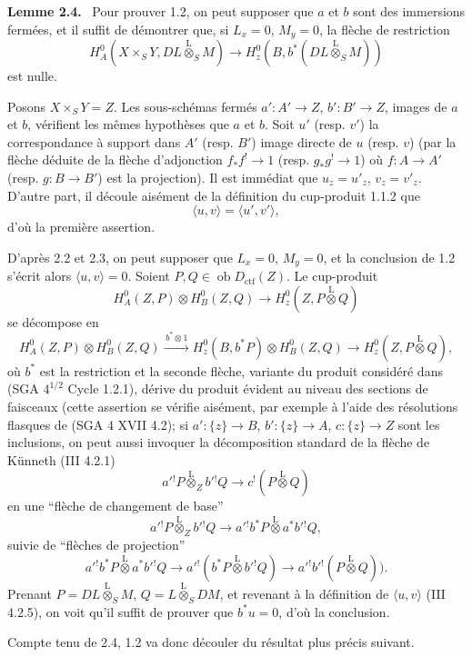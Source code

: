 \documentclass[11pt]{article}
\newenvironment{statement}[1]{\par\medskip\noindent\textbf{#1.}\ }{\par\medskip}
\providecommand{\lten}{\overset{\mathrm L}{\otimes}}
\providecommand{\Ob}{\operatorname{ob}}
\providecommand{\lten}{\overset{\mathrm L}{\otimes}}
\providecommand{\lten}{\overset{\mathrm L}{\otimes}}
\providecommand{\Ob}{\operatorname{ob}}
\providecommand{\lten}{\overset{\mathrm L}{\otimes}}
\providecommand{\lten}{\overset{\mathrm L}{\otimes}}
\providecommand{\Ob}{\operatorname{Ob}}
\providecommand{\lten}{\overset{\mathrm L}{\otimes}}
\providecommand{\Ob}{\operatorname{ob}}
\providecommand{\Ob}{\operatorname{Ob}}
\providecommand{\lten}{\overset{\mathrm L}{\otimes}}
\begin{document}
\begin{statement}{Lemme 2.4}
Pour prouver 1.2, on peut supposer que $a$ et $b$ sont des immersions fermées, et il suffit de démontrer que, si $L_x=0$, $M_y=0$, la flèche de restriction
\begin{equation}
H_A^0(X\times_SY,DL\lten_SM)
 \longrightarrow H_z^0(B,b^*(DL\lten_SM))
\tag{2.4.1}
\end{equation}
est nulle.
\end{statement}

Posons $X\times_SY=Z$. Les sous-schémas fermés $a':A'\to Z$, $b':B'\to Z$, images de $a$ et $b$, vérifient les mêmes hypothèses que $a$ et $b$. Soit $u'$ (resp. $v'$) la correspondance à support dans $A'$ (resp. $B'$) image directe de $u$ (resp. $v$) (par la flèche déduite de la flèche d'adjonction $f_*f^!\to 1$ (resp. $g_*g^!\to 1$) où $f:A\to A'$ (resp. $g:B\to B'$) est la projection). Il est immédiat que $u_z=u'_z$, $v_z=v'_z$. D'autre part, il découle aisément de la définition du cup-produit 1.1.2 que
\[
\langle u,v\rangle=\langle u',v'\rangle,
\]
d'où la première assertion.

D'après 2.2 et 2.3, on peut supposer que $L_x=0$, $M_y=0$, et la conclusion de 1.2 s'écrit alors $\langle u,v\rangle=0$. Soient $P,Q\in\Ob D_{\mathrm{ctf}}(Z)$. Le cup-produit
\[
H_A^0(Z,P)\otimes H_B^0(Z,Q)\longrightarrow H_z^0(Z,P\lten Q)
\]
se décompose en
\[
H_A^0(Z,P)\otimes H_B^0(Z,Q)
 \xrightarrow{\,b^*\otimes 1\,}
H_z^0(B,b^*P)\otimes H_B^0(Z,Q)
 \longrightarrow H_z^0(Z,P\lten Q),
\]
où $b^*$ est la restriction et la seconde flèche, variante du produit considéré dans (SGA $4^{1/2}$ Cycle 1.2.1), dérive du produit évident au niveau des sections de faisceaux (cette assertion se vérifie aisément, par exemple à l'aide des résolutions flasques de (SGA 4 XVII 4.2); si $a':\{z\}\to B$, $b':\{z\}\to A$, $c:\{z\}\to Z$ sont les inclusions, on peut aussi invoquer la décomposition standard de la flèche de Künneth (III 4.2.1)
\[
a'{}^!P\lten_Z b'{}^!Q\longrightarrow c^!(P\lten Q)
\]
en une ``flèche de changement de base''
\[
a'{}^!P\lten_Z b'{}^!Q\longrightarrow a'{}^!b^*P\lten a^*b'{}^!Q,
\]
suivie de ``flèches de projection''
\[
a'{}^!b^*P\lten a^*b'{}^!Q
 \longrightarrow a'{}^!(b^*P\lten b'{}^!Q)
 \longrightarrow a'{}^!b'{}^!(P\lten Q)).
\]
Prenant $P=DL\lten_SM$, $Q=L\lten_SDM$, et revenant à la définition de $\langle u,v\rangle$ (III 4.2.5), on voit qu'il suffit de prouver que $b^*u=0$, d'où la conclusion.

Compte tenu de 2.4, 1.2 va donc découler du résultat plus précis suivant.
\end{document}

